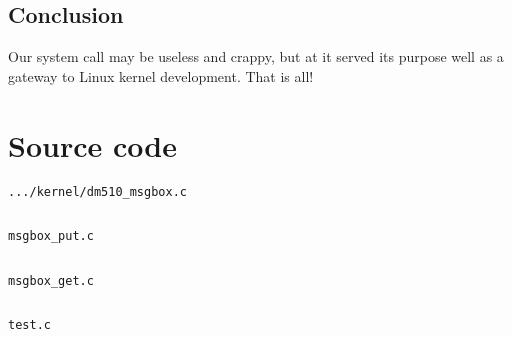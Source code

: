 \documentclass{report}
\newenvironment{longlisting}{\captionsetup{type=listing}}{}
\begin{document}
\section*{Conclusion}

Our system call may be useless and crappy, but at it served its purpose well as a gateway to Linux kernel development. That is all!

\appendix

\chapter{Source code}


\begin{longlisting}
	\caption{\texttt{.../kernel/dm510\_msgbox.c}}
	\label{lst:syscall}
	\inputminted{c}{../../uml/linux-6.1.9/arch/um/kernel/dm510_msgbox.c}
\end{longlisting}

\begin{longlisting}
	\caption{\texttt{msgbox\_put.c}}
	\label{lst:put}
	\inputminted{c}{../src/msgbox_put.c}
\end{longlisting}

\begin{longlisting}
	\caption{\texttt{msgbox\_get.c}}
	\label{lst:get}
	\inputminted{c}{../src/msgbox_get.c}
\end{longlisting}

\begin{longlisting}
	\caption{\texttt{test.c}}
	\label{lst:test}
	\inputminted{c}{../src/test.c}
\end{longlisting}
\end{document}
